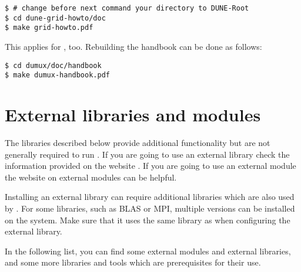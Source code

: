 \begin{lstlisting}[style=Bash]
$ # change before next command your directory to DUNE-Root
$ cd dune-grid-howto/doc
$ make grid-howto.pdf
\end{lstlisting}

This applies for \Dumux, too. Rebuilding the handbook can be done as follows:

\begin{lstlisting}[style=Bash]
$ cd dumux/doc/handbook
$ make dumux-handbook.pdf
\end{lstlisting}




\section{External libraries and modules} \label{sec:external-modules-libraries}

The libraries described below provide additional functionality but are not generally required to run \Dumux. 
If you are going to use an external library check the information provided on the \Dune website \cite{DUNE-EXT-LIB}.
If you are going to use an external \Dune module the website on external modules \cite{DUNE-EXT-MOD} can be helpful.

Installing an external library can require additional libraries which are also used by \Dune. 
For some libraries, such as BLAS or MPI, multiple versions can be installed on the system.
Make sure that it uses the same library as \Dune when configuring the external library.

In the following list, you can find some external modules and external libraries, and some more libraries and tools which are prerequisites for their use.

